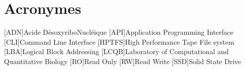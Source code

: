 
\chapter{Acronymes}
\begin{acronym}
	[ADN]{Acide DésoxyriboNucléique}
	[API]{Application Programming Interface}
	[CLI]{Command Line Interface}
	[HPTFS]{High Performance Tape File system}
	[LBA]{Logical Block Addressing}
	[LCQB]{Laboratory of Computational and Quantitative Biology}
	[RO]{Read Only}
	[RW]{Read Write}
	[SSD]{Solid State Drive}
\end{acronym}
